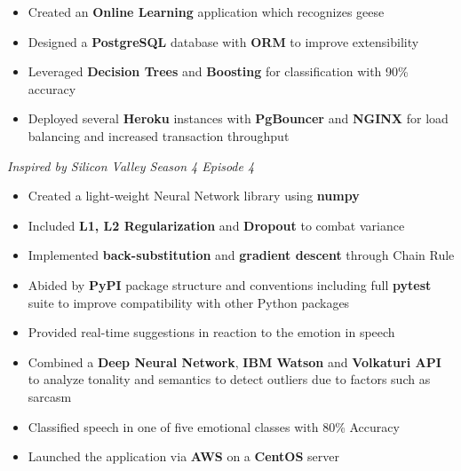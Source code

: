 \documentclass[10pt,a4paper,ragged2e]{altacv}
\begin{document}
\divider

\begin{itemize}
    \item Created an \textbf{Online Learning} application which recognizes geese
    \item Designed a \textbf{PostgreSQL} database with \textbf{ORM} to improve extensibility
    \item Leveraged \textbf{Decision Trees} and \textbf{Boosting} for classification with 90\% accuracy
    \item Deployed several \textbf{Heroku} instances with \textbf{PgBouncer} and \textbf{NGINX} for load balancing and increased transaction throughput
\end{itemize}
\textit{Inspired by Silicon Valley Season 4 Episode 4}

\divider

\begin{itemize}
    \item Created a light-weight Neural Network library using \textbf{numpy}
    \item Included \textbf{L1, L2 Regularization} and \textbf{Dropout} to combat variance
    \item Implemented \textbf{back-substitution} and \textbf{gradient descent} through Chain Rule
    \item Abided by \textbf{PyPI} package structure and conventions including full \textbf{pytest} suite to improve compatibility with other Python packages
\end{itemize}

\divider

\begin{itemize}
   \item Provided real-time suggestions in reaction to the emotion in speech
   \item Combined a \textbf{Deep Neural Network}, \textbf{IBM Watson} and \textbf{Volkaturi API} to analyze tonality and semantics to detect outliers due to factors such as sarcasm
   \item Classified speech in one of five emotional classes with 80\% Accuracy
   \item Launched the application via \textbf{AWS} on a \textbf{CentOS} server
\end{itemize}
\end{document}
